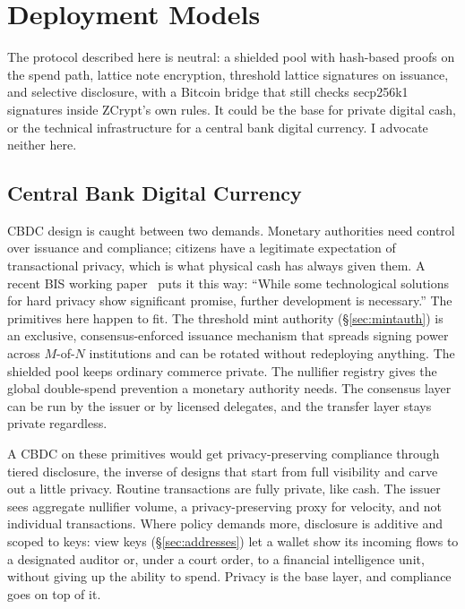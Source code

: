 \documentclass[twocolumn,10pt]{article}
\begin{document}
\section{Deployment Models}
\label{sec:deployment}

The protocol described here is neutral: a shielded pool with hash-based proofs on the spend path, lattice note encryption, threshold lattice signatures on issuance, and selective disclosure, with a Bitcoin bridge that still checks secp256k1 signatures inside ZCrypt's own rules. It could be the base for private digital cash, or the technical infrastructure for a central bank digital currency. I advocate neither here.

\subsection{Central Bank Digital Currency}

CBDC design is caught between two demands. Monetary authorities need control over issuance and compliance; citizens have a legitimate expectation of transactional privacy, which is what physical cash has always given them. A recent BIS working paper~\cite{bis1242} puts it this way: ``While some technological solutions for hard privacy show significant promise, further development is necessary.'' The primitives here happen to fit. The threshold mint authority (\S\ref{sec:mintauth}) is an exclusive, consensus-enforced issuance mechanism that spreads signing power across $M$-of-$N$ institutions and can be rotated without redeploying anything. The shielded pool keeps ordinary commerce private. The nullifier registry gives the global double-spend prevention a monetary authority needs. The consensus layer can be run by the issuer or by licensed delegates, and the transfer layer stays private regardless.

A CBDC on these primitives would get privacy-preserving compliance through tiered disclosure, the inverse of designs that start from full visibility and carve out a little privacy. Routine transactions are fully private, like cash. The issuer sees aggregate nullifier volume, a privacy-preserving proxy for velocity, and not individual transactions. Where policy demands more, disclosure is additive and scoped to keys: view keys (\S\ref{sec:addresses}) let a wallet show its incoming flows to a designated auditor or, under a court order, to a financial intelligence unit, without giving up the ability to spend. Privacy is the base layer, and compliance goes on top of it.
\end{document}
